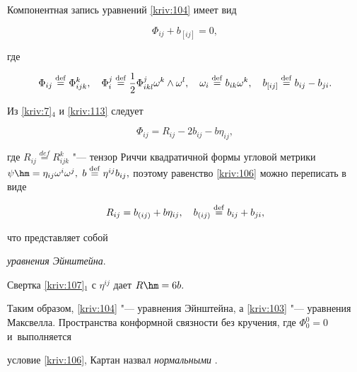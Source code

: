 Компонентная запись уравнений \eqref{kriv:104} имеет вид \cite[стр. 438]{bib:kriv:2} 

\begin{equation}

\Phi _{ij}+b_{\left[ ij\right] }=0,  \label{kriv:106}

\end{equation}

где

\begin{equation}

\Phi _{ij}\overset{\rm def}{=}\Phi _{ijk}^{k},\quad 

\Phi _{i}^{j}\overset{\rm def}{=}\frac{1}{2}\Phi _{ikl}^{j}\omega ^{k}\wedge \omega ^{l},\quad 

\omega _{i}\overset{\rm def}{=}b_{ik}\omega ^{k},\quad 

b_{\left[ ij\right] }\overset{\rm def}{=}b_{ij}-b_{ji}.  

\label{kriv:113}

\end{equation}

Из \eqref{kriv:7}$_{4}$ и \eqref{kriv:113} следует 

$$\Phi _{ij}=R_{ij}-2b_{ij}-b\eta _{ij},$$ 

где $R_{ij}\overset{def}{=}R_{ijk}^{k}$ "--- тензор Риччи квадратичной  формы угловой метрики $\psi \hm =\eta

_{ij}\omega ^{i}\omega ^{j},$  $b\overset{\rm def}{=}\eta ^{ij}b_{ij},$ поэтому равенство \eqref{kriv:106} можно переписать в виде

\begin{equation}

R_{ij}=b_{\left( ij\right) }+b\eta _{ij},\quad b_{\left( ij\right) }\overset{\rm def}{=}b_{ij}+b_{ji},  \label{kriv:107}

\end{equation}

что представляет собой 

\textit{уравнения Эйнштейна}. 

Свертка \eqref{kriv:107}$_{1}$ с $\eta ^{ij}$ дает $R\hm =6b.$ 

Таким образом, \eqref{kriv:104} "--- уравнения Эйнштейна, а \eqref{kriv:103} "--- уравнения Максвелла. Пространства конформной связности без кручения, где $\Phi _{0}^{0}=0$ и~выполняется

условие \eqref{kriv:106}, Картан назвал  \textit{нормальными} \cite[стр. 178]{bib:kriv:1}.



